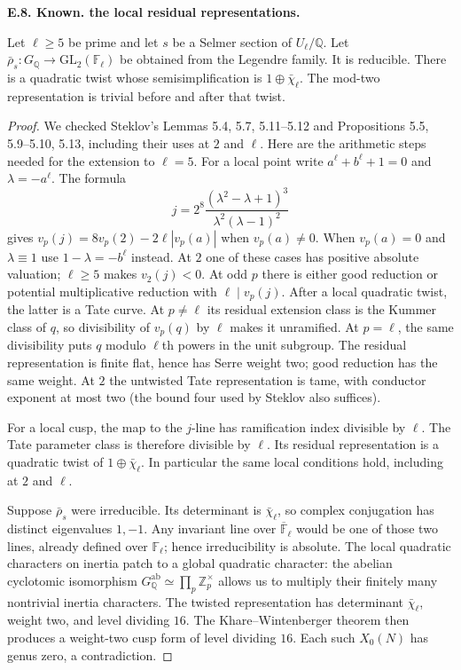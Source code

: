 \documentclass[11pt,oneside]{article}
\makeatletter
\newcounter{statementanchor}
\newenvironment{statement}[3]{%
 \refstepcounter{statementanchor}\def\@currentlabel{#1}%
 \par\addvspace{9pt}\noindent
 \textbf{#1. #2. #3.}\par\nobreak\noindent\ignorespaces
}{\par\addvspace{5pt}}
\makeatother
\begin{document}
\begin{statement}{E.8}{Known}{the local residual representations}
\label{st:E.8}
\label{E-local-representations}
Let $\ell\geq5$ be prime and let $s$ be a Selmer
section of $U_\ell/\mathbb Q$. Let
$\bar\rho_s:G_{\mathbb Q}\to\mathrm{GL}_2(\mathbb F_\ell)$
be obtained from the Legendre family.
It is reducible. There is a quadratic twist whose
semisimplification is $1\oplus\bar\chi_\ell$.
The mod-two representation is trivial before
and after that twist.
\end{statement}
\begin{proof}
We checked Steklov's Lemmas 5.4, 5.7, 5.11--5.12 and
Propositions 5.5, 5.9--5.10, 5.13, including their
uses at $2$ and $\ell$.
Here are the arithmetic steps needed for the
extension to $\ell=5$.
For a local point write
$a^\ell+b^\ell+1=0$ and $\lambda=-a^\ell$.
The formula
\[
 j=2^8\frac{(\lambda^2-\lambda+1)^3}
                {\lambda^2(\lambda-1)^2}
\]
gives $v_p(j)=8v_p(2)-2\ell|v_p(a)|$ when
$v_p(a)\ne0$. When $v_p(a)=0$ and $\lambda\equiv1$
use $1-\lambda=-b^\ell$ instead. At $2$ one of
these cases has positive absolute valuation;
$\ell\geq5$ makes $v_2(j)<0$. At odd $p$ there
is either good reduction or potential multiplicative
reduction with $\ell\mid v_p(j)$.
After a local quadratic twist, the latter is a
Tate curve. At $p\ne\ell$ its residual extension
class is the Kummer class of $q$, so divisibility
of $v_p(q)$ by $\ell$ makes it unramified.
At $p=\ell$, the same divisibility puts $q$
modulo $\ell$th powers in the unit subgroup.
The residual representation is finite flat,
hence has Serre weight two; good reduction has
the same weight. At $2$ the untwisted Tate
representation is tame, with conductor exponent
at most two (the bound four used by Steklov
also suffices).

For a local cusp, the map to the $j$-line has
ramification index divisible by $\ell$.
The Tate parameter class is therefore divisible
by $\ell$. Its residual representation is a
quadratic twist of $1\oplus\bar\chi_\ell$.
In particular the same local conditions hold,
including at $2$ and $\ell$.

Suppose $\bar\rho_s$ were irreducible.
Its determinant is $\bar\chi_\ell$, so complex
conjugation has distinct eigenvalues $1,-1$.
Any invariant line over $\overline{\mathbb F}_\ell$
would be one of those two lines, already defined
over $\mathbb F_\ell$; hence irreducibility is
absolute. The local quadratic characters on
inertia patch to a global quadratic character:
the abelian cyclotomic isomorphism
$G_{\mathbb Q}^{\mathrm{ab}}\simeq
 \prod_p\mathbb Z_p^\times$
allows us to multiply their finitely many
nontrivial inertia characters. The twisted
representation has determinant $\bar\chi_\ell$,
weight two, and level dividing $16$.
The Khare--Wintenberger theorem then produces
a weight-two cusp form of level dividing $16$.
Each such $X_0(N)$ has genus zero, a contradiction.


\end{proof}
\end{document}
